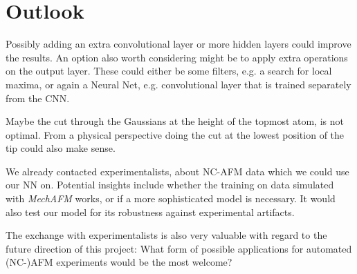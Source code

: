 \documentclass{article}
\begin{document}
\newpage
\section{Outlook}

Possibly adding an extra convolutional layer or more hidden layers could improve the results. An option also worth considering might be to apply extra operations on the output layer. These could either be some filters, e.g. a search for local maxima, or again a Neural Net, e.g. convolutional layer that is trained separately from the CNN.

Maybe the cut through the Gaussians at the height of the topmost atom, is not optimal. From a physical perspective doing the cut at the lowest position of the tip could also make sense.

We already contacted experimentalists, about NC-AFM data which we could use our NN on. Potential insights include whether the training on data simulated with \emph{MechAFM} works, or if a more sophisticated model is necessary. It would also test our model for its robustness against experimental artifacts.

The exchange with experimentalists is also very valuable with regard to the future direction of this project: What form of possible applications for automated (NC-)AFM experiments would be the most welcome?




\newpage


\end{document}
